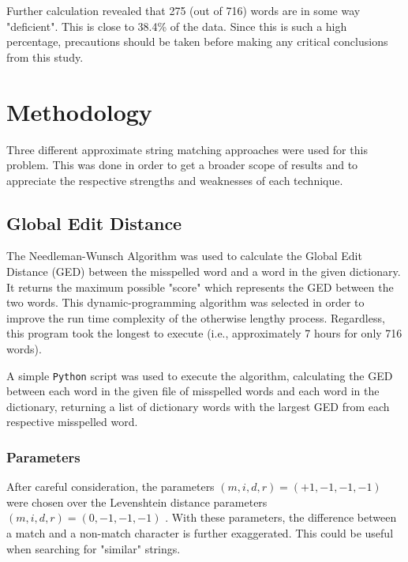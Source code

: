 \documentclass[11pt]{article}
\begin{document}
Further calculation revealed that 275 (out of 716) words are in some way "deficient". This is close to 38.4\% of the data. Since this is such a high percentage, precautions should be taken before making any critical conclusions from this study. %




\section{Methodology}
Three different approximate string matching approaches were used for this problem. This was done in order to get a broader scope of results and to appreciate the respective strengths and weaknesses of each technique.



\subsection{Global Edit Distance}
The Needleman-Wunsch Algorithm %
was used to calculate the Global Edit Distance (GED) between the misspelled word and a word in the given dictionary. It returns the maximum possible "score" which represents the GED between the two words. This dynamic-programming algorithm was selected in order to improve the run time complexity of the otherwise lengthy process. Regardless, this program took the longest to execute (i.e., approximately 7 hours for only 716 words).

A simple \texttt{Python} script was used to execute the algorithm, calculating the GED between each word in the given file of misspelled words and each word in the dictionary, returning a list of dictionary words with the largest GED from each respective misspelled word.

\subsubsection{Parameters}
After careful consideration, the parameters \((m, i, d, r) = (+1, -1, -1, -1)\) were chosen over the Levenshtein distance parameters \((m, i, d, r) = (0, -1, -1, -1)\) %
. With these parameters, the difference between a match and a non-match character is further exaggerated. This could be useful when searching for "similar" strings.
\end{document}

